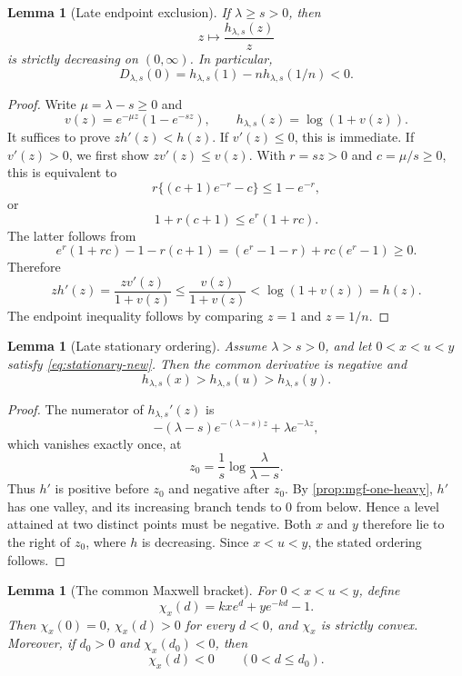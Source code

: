 \documentclass[11pt]{article}
\theoremstyle{plain}
\newtheorem{lemma}[theorem]{Lemma}
\theoremstyle{definition}
\theoremstyle{remark}
\begin{document}
\begin{lemma}[Late endpoint exclusion]\label{lem:late-endpoint-exclusion}
If \(\lambda\ge s>0\), then
\[
z\longmapsto \frac{h_{\lambda,s}(z)}z
\]
is strictly decreasing on \((0,\infty)\).  In particular,
\begin{equation}\label{eq:D0-neg-new}
D_{\lambda,s}(0)=h_{\lambda,s}(1)-nh_{\lambda,s}(1/n)<0.
\end{equation}
\end{lemma}

\begin{proof}
Write \(\mu=\lambda-s\ge0\) and
\[
v(z)=e^{-\mu z}(1-e^{-sz}),\qquad h_{\lambda,s}(z)=\log(1+v(z)).
\]
It suffices to prove \(zh'(z)<h(z)\).  If \(v'(z)\le0\), this is immediate.  If \(v'(z)>0\), we first show \(zv'(z)\le v(z)\).  With \(r=sz>0\) and \(c=\mu/s\ge0\), this is equivalent to
\[
r\{(c+1)e^{-r}-c\}\le1-e^{-r},
\]
or
\[
1+r(c+1)\le e^r(1+rc).
\]
The latter follows from
\[
e^r(1+rc)-1-r(c+1)
=(e^r-1-r)+rc(e^r-1)\ge0.
\]
Therefore
\[
zh'(z)=\frac{zv'(z)}{1+v(z)}
\le\frac{v(z)}{1+v(z)}
<\log(1+v(z))=h(z).
\]
The endpoint inequality follows by comparing \(z=1\) and \(z=1/n\).
\end{proof}

\begin{lemma}[Late stationary ordering]\label{lem:late-ordering-new}
Assume \(\lambda>s>0\), and let \(0<x<u<y\) satisfy \eqref{eq:stationary-new}.  Then the common derivative is negative and
\[
h_{\lambda,s}(x)>h_{\lambda,s}(u)>h_{\lambda,s}(y).
\]
\end{lemma}

\begin{proof}
The numerator of \(h_{\lambda,s}'(z)\) is
\[
-(\lambda-s)e^{-(\lambda-s)z}+\lambda e^{-\lambda z},
\]
which vanishes exactly once, at
\[
z_0=\frac1s\log\frac{\lambda}{\lambda-s}.
\]
Thus \(h'\) is positive before \(z_0\) and negative after \(z_0\).  By \cref{prop:mgf-one-heavy}, \(h'\) has one valley, and its increasing branch tends to \(0\) from below.  Hence a level attained at two distinct points must be negative.  Both \(x\) and \(y\) therefore lie to the right of \(z_0\), where \(h\) is decreasing.  Since \(x<u<y\), the stated ordering follows.
\end{proof}

\begin{lemma}[The common Maxwell bracket]\label{lem:maxwell-bracket}
For \(0<x<u<y\), define
\begin{equation}\label{eq:chi-def}
\chi_x(d)=kx e^d+y e^{-kd}-1.
\end{equation}
Then \(\chi_x(0)=0\), \(\chi_x(d)>0\) for every \(d<0\), and \(\chi_x\) is strictly convex.  Moreover, if \(d_0>0\) and \(\chi_x(d_0)<0\), then
\[
\chi_x(d)<0
\qquad(0<d\le d_0).
\]
\end{lemma}
\end{document}
